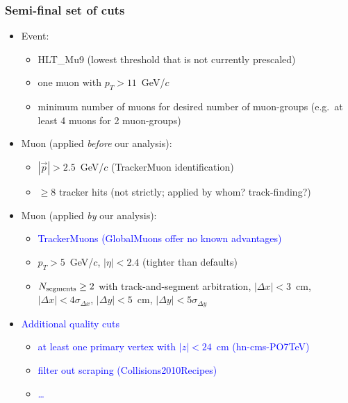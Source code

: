 \documentclass[compress]{beamer}
\newcommand{\s}[1]{{\mbox{\scriptsize #1}}}
\begin{document}
\begin{frame}
\frametitle{Semi-final set of cuts}

\begin{itemize}
\item Event:
\begin{itemize}
\item HLT\_Mu9 (lowest threshold that is not currently prescaled)
\item one muon with $p_T > 11$~GeV/$c$
\item minimum number of muons for desired number of muon-groups
  (e.g.\ at least 4 muons for 2 muon-groups)
\end{itemize}

\item Muon (applied {\it before} our analysis):
\begin{itemize}
\item $|\vec{p}| > 2.5$~GeV/$c$ (TrackerMuon identification)
\item $\ge 8$ tracker hits (not strictly; applied by whom? track-finding?)
\end{itemize}

\item Muon (applied {\it by} our analysis):
\begin{itemize}
\item \textcolor{blue}{TrackerMuons (GlobalMuons offer no known advantages)}
\item $p_T > 5$~GeV/$c$, $|\eta| < 2.4$ (tighter than defaults)
\item $N_\s{segments} \ge 2$ with track-and-segment arbitration, $|\Delta x| < 3$~cm, $|\Delta x| < 4 \sigma_{\Delta x}$, $|\Delta y| < 5$~cm, $|\Delta y| < 5 \sigma_{\Delta y}$
\end{itemize}

\item \textcolor{blue}{Additional quality cuts}
\begin{itemize}
\item \textcolor{blue}{at least one primary vertex with $|z| < 24$~cm (hn-cms-PO7TeV)}
\item \textcolor{blue}{filter out scraping (Collisions2010Recipes)}
\item \textcolor{blue}{\ldots}
\end{itemize}
\end{itemize}
\end{frame}
\end{document}
